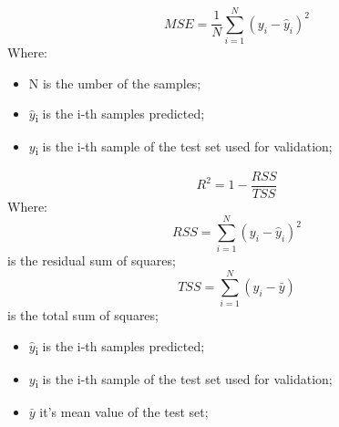 \begin{equation}
MSE = \frac{1}{N}\sum_{i=1}^{N}(y_i-\hat{y}_i)^2
\end{equation}
Where:
\begin{itemize}
    \item N is the umber of the samples;
    \item $\hat{y}$\textsubscript{i} is the i-th samples predicted;
    \item $y$\textsubscript{i} is the i-th sample of the test set used for validation;
\end{itemize}
\begin{equation}
R^2 = 1 - \frac{RSS}{TSS}    
\end{equation}
Where:
\begin{equation}RSS = \sum_{i=1}^{N}(y_i-\hat{y}_i)^2 \end{equation}is the residual sum of squares;
\begin{equation} TSS =  \sum_{i=1}^{N}(y_i-\bar{y})\end{equation} is the total sum of squares;
\begin{itemize}
    \item $\hat{y}$\textsubscript{i} is the i-th samples predicted;
    \item $y$\textsubscript{i} is the i-th sample of the test set used for validation;
    \item $\bar{y}$ it's mean value of the test set;
\end{itemize}

